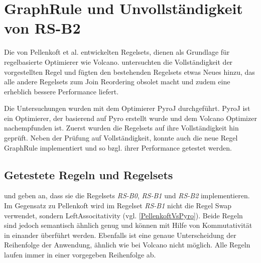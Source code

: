 \section{GraphRule und Unvollständigkeit von RS-B2}

Die von Pellenkoft et al. entwickelten Regelsets, dienen als Grundlage für regelbasierte Optimierer wie Volcano. \cite{shanbhag2014optimizing} untersuchten die Vollständigkeit der vorgestellten Regel und fügten den bestehenden Regelsets etwas Neues hinzu, das alle andere Regelsets zum Join Reordering obsolet macht und zudem eine erheblich bessere Performance liefert.

Die Untersuchungen \cite{shanbhag2014optimizing} wurden mit dem Optimierer PyroJ durchgeführt. PyroJ ist ein Optimierer, der basierend auf Pyro \cite{roy2001multi} erstellt wurde und dem Volcano Optimizer nachempfunden ist. Zuerst wurden die Regelsets auf ihre Vollständigkeit hin geprüft. Neben der Prüfung auf Vollständigkeit, konnte auch die neue Regel GraphRule implementiert und so bzgl. ihrer Performance getestet werden.



\subsection{Getestete Regeln und Regelsets}

\cite{shanbhag2014optimizing} und \cite{roy2001multi} geben an, dass sie die Regelsets \textit{RS-B0}, \textit{RS-B1} und \textit{RS-B2} implementieren. Im Gegensatz zu Pellenkoft wird im Regelset \textit{RS-B1} nicht die Regel Swap verwendet, sondern Left\-Associtativity (vgl. \ref{PellenkoftVsPyro}). Beide Regeln sind jedoch semantisch ähnlich genug und können mit Hilfe von Kommutativität in einander überführt werden. Ebenfalls ist eine genaue Unterscheidung der Reihenfolge der Anwendung, ähnlich wie bei Volcano nicht möglich. Alle Regeln laufen immer in einer vorgegeben Reihenfolge ab.

